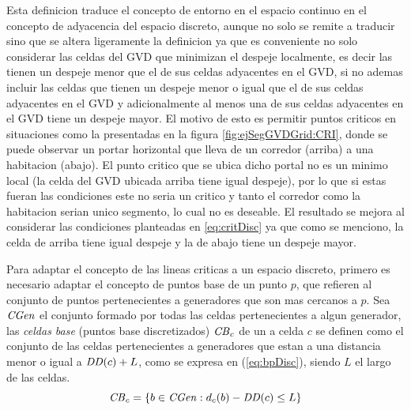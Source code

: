 Esta definicion traduce el concepto de entorno en el espacio continuo
en el concepto de adyacencia del espacio discreto, aunque no solo se remite a
traducir sino que se altera ligeramente la definicion ya que es conveniente no
solo considerar las celdas del GVD que minimizan el despeje localmente, es
decir las tienen un despeje menor que el de sus celdas adyacentes en el GVD, si
no ademas incluir las celdas que tienen un despeje menor o igual que el de sus
celdas adyacentes en el GVD y adicionalmente al menos una de sus celdas
adyacentes en el GVD tiene un despeje mayor.
El motivo de esto es permitir puntos criticos en situaciones como la
presentadas en la figura \ref{fig:ejSegGVDGrid:CRI}, donde se puede observar un
portar horizontal que lleva de un corredor (arriba) a una habitacion (abajo).
El punto critico que se ubica dicho portal no es un minimo local (la celda del
GVD ubicada arriba tiene igual despeje), por lo que si estas fueran las
condiciones este no seria un critico y tanto el corredor como la habitacion
serian unico segmento, lo cual no es deseable. El resultado se mejora al
considerar las condiciones planteadas en \ref{eq:critDisc} ya que como se
menciono, la celda de arriba tiene igual despeje y la de abajo tiene un despeje
mayor. 



Para adaptar el concepto de las lineas criticas a un espacio discreto, primero
es necesario adaptar el concepto de puntos base de un punto $p$, que refieren
al conjunto de puntos pertenecientes a generadores que son mas cercanos a $p$.
Sea $\mathit{CGen}$ el conjunto formado por todas las celdas pertenecientes a
algun generador, las \emph{celdas base} (puntos base discretizados) $\mathit{CB}_c$ de
un a celda $c$ se definen como el conjunto de las celdas pertenecientes a
generadores que estan a una distancia menor o igual a $\mathit{DD}(c)+L$, como se
expresa en (\ref{eq:bpDisc}), siendo $L$ el largo de las celdas.
\begin{equation}
\mathit{CB}_c = \{ b \in \mathit{CGen} : d_c(b) - \mathit{DD}(c) \leq L\}
\label{eq:bpDisc}
\end{equation}

